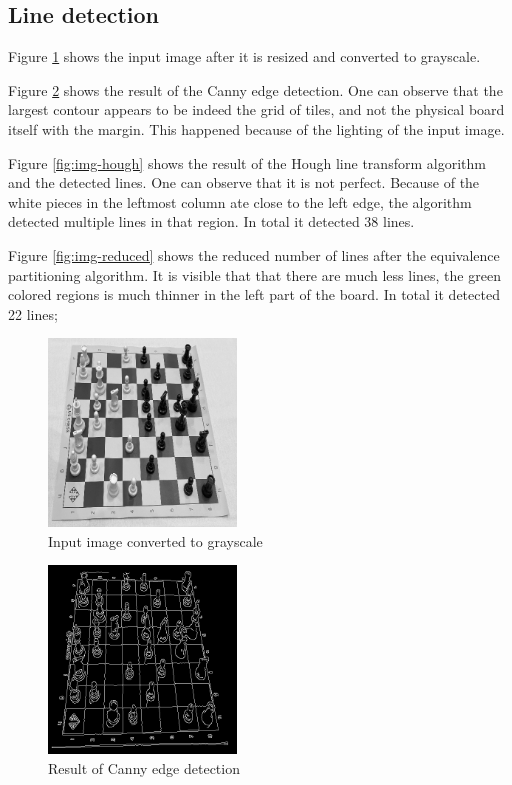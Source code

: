 \documentclass[conference]{IEEEtran}
\begin{document}
\subsection{Line detection}
\label{sec:line_detection}

Figure \ref{fig:img-gray} shows the input image after it is resized and converted to grayscale.

Figure \ref{fig:img-canny} shows the result of the Canny edge detection. One can observe that the largest contour appears to be indeed the grid of tiles, and not the physical board itself with the margin. This happened because of the lighting of the input image.

Figure \ref{fig:img-hough} shows the result of the Hough line transform algorithm and the detected lines. One can observe that it is not perfect. Because of the white pieces in the leftmost column ate close to the left edge, the algorithm detected multiple lines in that region. In total it detected 38 lines.

Figure \ref{fig:img-reduced} shows the reduced number of lines after the equivalence partitioning algorithm. It is visible that that there are much less lines, the green colored regions is much thinner in the left part of  the board. In total it detected 22 lines;

\begin{figure}[bt] 
    \centering
    \includegraphics[width=5cm]{Figures/image-gray.png}
    \caption{Input image converted to grayscale}
    \label{fig:img-gray}
\end{figure}



\begin{figure}[bt] 
    \centering
    \includegraphics[width=5cm]{Figures/Canny edge detection.png}
    \caption{Result of Canny edge detection}
    \label{fig:img-canny}
\end{figure}
\end{document}
